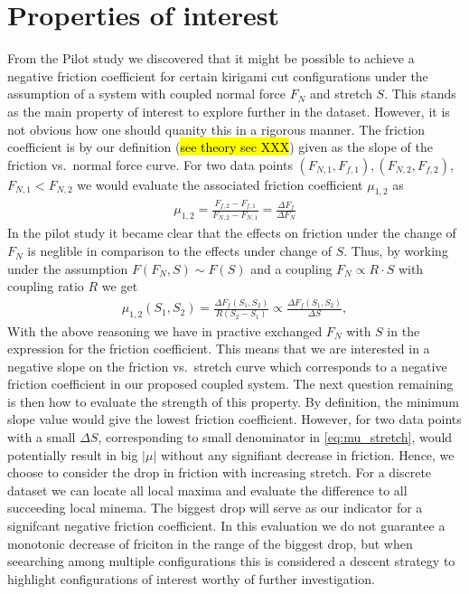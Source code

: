 \section{Properties of interest} 
From the Pilot study we discovered that it might be possible to achieve a negative friction coefficient for certain kirigami cut configurations under the assumption of a system with coupled normal force $F_N$ and stretch $S$. This stands as the main property of interest to explore further in the dataset. However, it is not obvious how one should quanity this in a rigorous manner. The friction coefficient is by our definition (\hl{see theory sec XXX}) given as the slope of the friction vs.\ normal force curve. For two data points $(F_{N,1}, F_{f,1}), (F_{N,2}, F_{f,2})$, $F_{N,1} < F_{N,2}$ we would evaluate the associated friction coefficient $\mu_{1,2}$ as 
\begin{align*}
  \mu_{1,2} = \frac{F_{f,2} - F_{f,1}}{F_{N,2} - F_{N,1}} = \frac{\Delta F_f}{\Delta F_N}
\end{align*}
In the pilot study it became clear that the effects on friction under the change of $F_N$ is neglible in comparison to the effects under change of $S$. Thus, by working under the assumption $F(F_N, S) \sim F(S)$ and a coupling $F_N \propto R\cdot S$ with coupling ratio $R$ we get 
\begin{align}
  \mu_{1,2}(S_1, S_2) = \frac{\Delta F_{f}(S_1, S_2)}{R(S_2 - S_1)} \propto \frac{\Delta F_{f}(S_1, S_2)}{\Delta S},
  \label{eq:mu_stretch}
\end{align}
With the above reasoning we have in practive exchanged $F_N$ with $S$ in the
expression for the friction coefficient. This means that we are interested in  a
negative slope on the friction vs.\ stretch curve which corresponds to a
negative friction coefficient in our proposed coupled system. The next question
remaining is then how to evaluate the strength of this property. By definition,
the minimum slope value would give the lowest friction coefficient. However, for two data points with a small $\Delta S$, corresponding to small denominator in \cref{eq:mu_stretch}, would potentially result in big $|\mu|$ without any signifiant decrease in friction. Hence, we choose to consider the drop in friction with increasing stretch. For a discrete dataset we can locate all local maxima and evaluate the difference to all succeeding local minema. The biggest drop will serve as our indicator for a signifcant negative friction coefficient. In this evaluation we do not guarantee a monotonic decrease of friciton in the range of the biggest drop, but when seearching among multiple configurations this is considered a descent strategy to highlight configurations of interest worthy of further investigation. 

